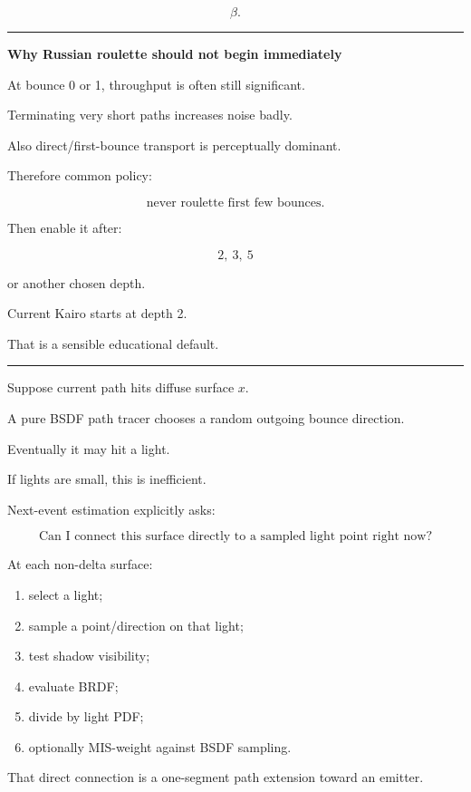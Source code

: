 \[
\beta.
\]

\begin{center}\rule{0.5\linewidth}{0.5pt}\end{center}

\textbf{Why Russian roulette should not begin immediately}

At bounce 0 or 1, throughput is often still significant.

Terminating very short paths increases noise badly.

Also direct/first-bounce transport is perceptually dominant.

Therefore common policy:

\[
\text{never roulette first few bounces}.
\]

Then enable it after:

\[
2,\ 3,\ 5
\]

or another chosen depth.

Current Kairo starts at depth 2.

That is a sensible educational default.

\begin{center}\rule{0.5\linewidth}{0.5pt}\end{center}

Suppose current path hits diffuse surface \(x\).

A pure BSDF path tracer chooses a random outgoing bounce direction.

Eventually it may hit a light.

If lights are small, this is inefficient.

Next-event estimation explicitly asks:

\[
\boxed{
\text{Can I connect this surface directly to a sampled light point right now?}
}
\]

At each non-delta surface:

\begin{enumerate}
\def\labelenumi{\arabic{enumi}.}
\tightlist
\item
  select a light;
\item
  sample a point/direction on that light;
\item
  test shadow visibility;
\item
  evaluate BRDF;
\item
  divide by light PDF;
\item
  optionally MIS-weight against BSDF sampling.
\end{enumerate}

That direct connection is a one-segment path extension toward an emitter.

